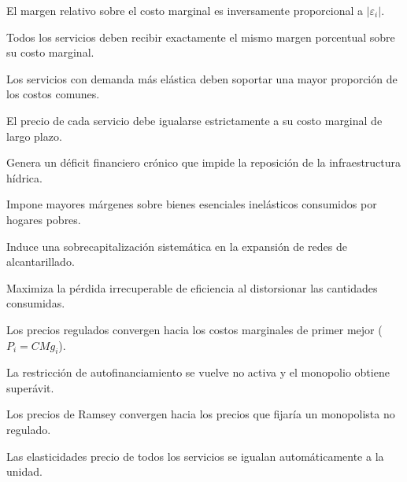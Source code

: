 \begin{opts}
    \item El margen relativo sobre el costo marginal es inversamente proporcional a $|\varepsilon_i|$.
    \item Todos los servicios deben recibir exactamente el mismo margen porcentual sobre su costo marginal.
    \item Los servicios con demanda más elástica deben soportar una mayor proporción de los costos comunes.
    \item El precio de cada servicio debe igualarse estrictamente a su costo marginal de largo plazo.
\end{opts}

\begin{opts}
    \item Genera un déficit financiero crónico que impide la reposición de la infraestructura hídrica.
    \item Impone mayores márgenes sobre bienes esenciales inelásticos consumidos por hogares pobres.
    \item Induce una sobrecapitalización sistemática en la expansión de redes de alcantarillado.
    \item Maximiza la pérdida irrecuperable de eficiencia al distorsionar las cantidades consumidas.
\end{opts}

\begin{opts}
    \item Los precios regulados convergen hacia los costos marginales de primer mejor ($P_i = CMg_i$).
    \item La restricción de autofinanciamiento se vuelve no activa y el monopolio obtiene superávit.
    \item Los precios de Ramsey convergen hacia los precios que fijaría un monopolista no regulado.
    \item Las elasticidades precio de todos los servicios se igualan automáticamente a la unidad.
\end{opts}

